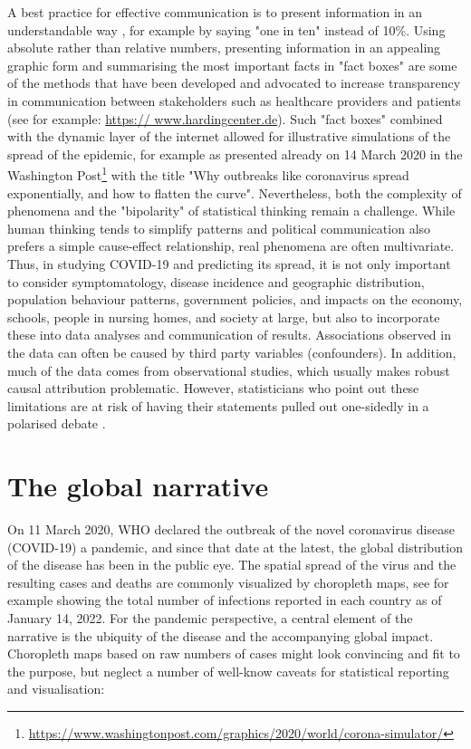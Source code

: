 \documentclass[article]{jdssv}\usepackage[]{graphicx}\usepackage[]{color}
\begin{document}
A best practice for effective communication is to present information in an understandable way \citep{gigerenzerHelpingDoctorsPatients2007,gigerenzerWhatAreNatural2011}, for example by saying "one in ten" instead of 10\%. Using absolute rather than relative numbers, presenting information in an appealing graphic form and summarising the most important facts in "fact boxes" are some of the methods that have been developed and advocated to increase transparency in communication between stakeholders such as healthcare providers and patients (see for example: \url{https:// www.hardingcenter.de}). Such "fact boxes" combined with the dynamic layer of the internet allowed for illustrative simulations of the spread of the epidemic, for example as presented already on 14 March 2020 in the Washington Post\footnote{\url{https://www.washingtonpost.com/graphics/2020/world/corona-simulator/}} with the title "Why outbreaks like coronavirus spread exponentially, and how to flatten the curve".  Nevertheless, both the complexity of phenomena and the "bipolarity" of statistical thinking remain a challenge. While human thinking tends to simplify patterns and political communication also prefers a simple cause-effect relationship, real phenomena are often multivariate. Thus, in studying COVID-19 and predicting its spread, it is not only important to consider symptomatology, disease incidence and geographic distribution, population behaviour patterns, government policies, and impacts on the economy, schools, people in nursing homes, and society at large, but also to incorporate these into data analyses and communication of results. Associations observed in the data can often be caused by third party variables (confounders). In addition, much of the data comes from observational studies, which usually makes robust causal attribution problematic. However, statisticians who point out these limitations are at risk of having their statements pulled out one-sidedly in a polarised debate \citep{McConway2021}.

\section{The global narrative}

On 11 March 2020, WHO declared the outbreak of the novel coronavirus disease (COVID-19) a pandemic, and since that date at the latest, the global distribution of the disease has been in the public eye. The spatial spread of the virus and the resulting cases and deaths are commonly visualized by choropleth maps, see for example  showing the total number of infections reported in each country as of January 14, 2022. For the pandemic perspective, a central element of the narrative is the ubiquity of the disease and the accompanying global impact. Choropleth maps based on raw numbers of cases might look convincing and fit to the purpose, but neglect a number of well-know caveats for statistical reporting and visualisation:
\end{document}
